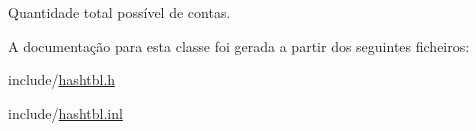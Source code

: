 Quantidade total possível de contas. 



A documentação para esta classe foi gerada a partir dos seguintes ficheiros\+:\begin{DoxyCompactItemize}
\item 
include/\hyperlink{hashtbl_8h}{hashtbl.\+h}\item 
include/\hyperlink{hashtbl_8inl}{hashtbl.\+inl}\end{DoxyCompactItemize}
